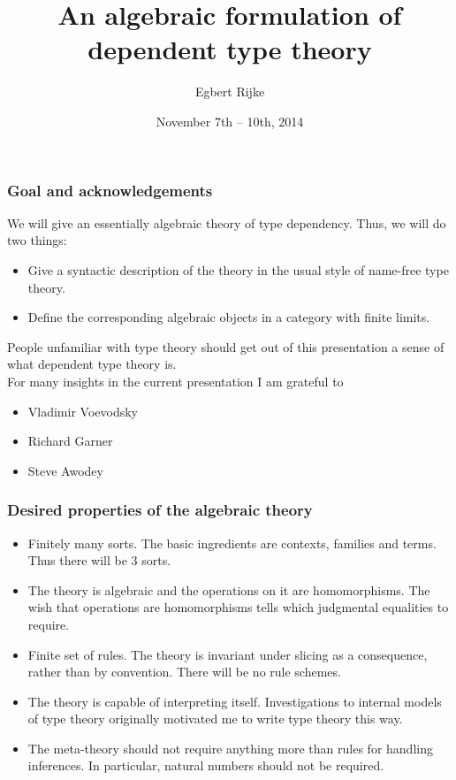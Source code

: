 \documentclass[handout]{beamer}
\title{\bf An algebraic formulation of dependent type theory}
\author{Egbert Rijke}
\institute{Carnegie Mellon University}
\date{November 7th -- 10th, 2014}
\begin{document}
\begin{frame}
\titlepage
\end{frame}

\begin{frame}
\frametitle{\bf Goal and acknowledgements}
We will give an essentially algebraic theory of type dependency. Thus, we will
do two things:
\begin{itemize}
\item Give a syntactic description of the theory in the usual style of
name-free type theory.
\item Define the corresponding algebraic objects in a category with finite limits.
\end{itemize}
\pause
People unfamiliar with type theory should get out of this presentation 
a sense of what dependent type theory is.
\\[\baselineskip]
\pause
For many insights in the current presentation I am grateful to
\begin{itemize}
\item Vladimir Voevodsky
\item Richard Garner
\item Steve Awodey
\end{itemize}
\end{frame}

\begin{frame}
\frametitle{\bf Desired properties of the algebraic theory}
\begin{itemize}
\item Finitely many sorts. The basic ingredients are contexts, families and
terms. Thus there will be 3 sorts.
\pause
\item The theory is algebraic and the operations on it are homomorphisms. The
wish that operations are homomorphisms tells which judgmental equalities to
require.
\pause
\item Finite set of rules. The theory is invariant under slicing as a consequence, rather than by
convention. There will be no rule schemes.
\pause
\item The theory is capable of interpreting itself. Investigations to internal
models of type theory originally motivated me to write type theory this way.
\pause
\item The meta-theory should not require anything more than rules for handling
inferences. In particular, natural numbers should not be required.
\end{itemize}
\end{frame}
\end{document}

